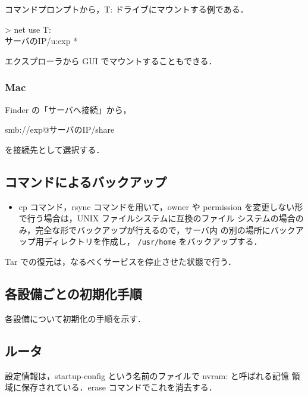 コマンドプロンプトから，T: ドライブにマウントする例である．

\begin{cli}
> net use T: \\サーバのIP\share /u:exp *
\end{cli}

エクスプローラから GUI でマウントすることもできる．

\subsubsection*{Mac}

Finder の「サーバへ接続」から，
\begin{center}
 smb://exp@サーバのIP/share
\end{center}
を接続先として選択する．



\subsection{コマンドによるバックアップ}

\begin{itemize}
 \item cp コマンド，rsync コマンドを用いて，owner や permission 
       を変更しない形で行う場合は，UNIX ファイルシステムに互換のファイル
       システムの場合のみ，完全な形でバックアップが行えるので，サーバ内
       の別の場所にバックアップ用ディレクトリを作成し，
       \texttt{/usr/home} をバックアップする．
\end{itemize}

Tar での復元は，なるべくサービスを停止させた状態で行う．


\subsection{各設備ごとの初期化手順}

各設備について初期化の手順を示す．

\subsection*{ルータ}

設定情報は，startup-config という名前のファイルで nvram: と呼ばれる記憶
領域に保存されている．erase コマンドでこれを消去する．

